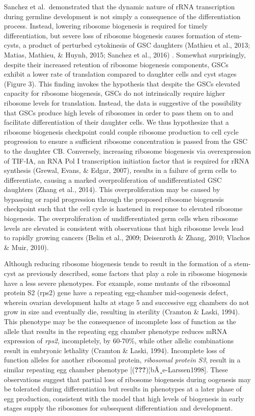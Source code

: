 \documentclass[12pt,twoside]{reedthesis}
\begin{document}
Sanchez et al.~demonstrated that the dynamic nature of rRNA
transcription during germline development is not simply a consequence of
the differentiation process. Instead, lowering ribosome biogenesis is
required for timely differentiation, but severe loss of ribosome
biogenesis causes formation of stem-cysts, a product of perturbed
cytokinesis of GSC daughters (Mathieu et al., 2013; Matias, Mathieu, \& Huynh, 2015; Sanchez et al., 2016) . Somewhat surprisingly, despite their increased
retention of ribosome biogenesis components, GSCs exhibit a lower rate
of translation compared to daughter cells and cyst stages (Figure 3).
This finding invokes the hypothesis that despite the GSCs elevated
capacity for ribosome biogenesis, GSCs do not intrinsically require
higher ribosome levels for translation. Instead, the data is suggestive
of the possibility that GSCs produce high levels of ribosomes in order
to pass them on to and facilitate differentiation of their daughter
cells. We thus hypothesize that a ribosome biogenesis checkpoint could
couple ribosome production to cell cycle progression to ensure a
sufficient ribosome concentration is passed from the GSC to the daughter
CB. Conversely, increasing ribosome biogenesis via overexpression of
TIF-IA, an RNA Pol I transcription initiation factor that is required
for rRNA synthesis (Grewal, Evans, \& Edgar, 2007), results in a failure of germ cells
to differentiate, causing a marked overproliferation of undifferentiated
GSC daughters (Zhang et al., 2014). This overproliferation may be caused by
bypassing or rapid progression through the proposed ribosome biogenesis
checkpoint such that the cell cycle is hastened in response to elevated
ribosome biogenesis. The overproliferation of undifferentiated germ
cells when ribosome levels are elevated is consistent with observations
that high ribosome levels lead to rapidly growing cancers
(Belin et al., 2009; Deisenroth \& Zhang, 2010; Vlachos \& Muir, 2010).

Although reducing ribosome biogenesis tends to result in the formation
of a stem-cyst as previously described, some factors that play a role in
ribosome biogenesis have a less severe phenotypes. For example, some
mutants of the ribosomal protein S2 (rps2) gene have a repeating
egg-chamber mid-oogenesis defect, wherein ovarian development halts at
stage 5 and successive egg chambers do not grow in size and eventually
die, resulting in sterility (Cramton \& Laski, 1994). This phenotype may be
the consequence of incomplete loss of function as the allele that
results in the repeating egg chamber phenotype reduces mRNA expression
of \emph{rps2}, incompletely, by 60-70\%, while other allelic combinations
result in embryonic lethality (Cramton \& Laski, 1994). Incomplete loss of
function alleles for another ribosomal protein, \emph{ribosomal protein S3},
result in a similar repeating egg chamber phenotype
{[}({\textbf{???}})¦bÃ¸e-Larssen1998{]}. These observations suggest that partial loss of
ribosome biogenesis during oogenesis may be tolerated during
differentiation but results in phenotypes at a later phase of egg
production, consistent with the model that high levels of biogenesis in
early stages supply the ribosomes for subsequent differentiation and
development.
\end{document}
